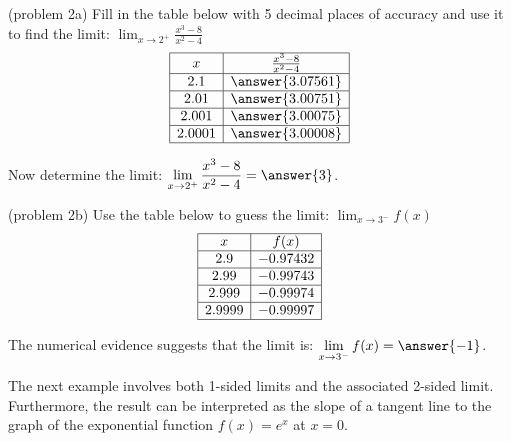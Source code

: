 \documentclass[handout]{ximera}
\begin{document}
\begin{problem}(problem 2a)
Fill in the table below with 5 decimal places of accuracy and use it to find the limit: $\displaystyle \lim_{x \to 2^+} \frac{x^3 - 8}{x^2 - 4}$\\

\[
\begin{array}{| c | c|}
	\hline
  x & \frac{x^3 - 8}{x^2 - 4}  \\ 
	\hline 
	2.1 &  \answer{3.07561}\\
	\hline
	2.01 &  \answer{3.00751}\\
	\hline
	2.001 &  \answer{3.00075}\\
	\hline
	2.0001 &  \answer{3.00008}\\
	\hline
\end{array}
\]


Now determine the limit: $\displaystyle \lim_{x \to 2^+} \frac{x^3 - 8}{x^2 - 4} = \answer{3}$.
\end{problem}


\begin{problem}(problem 2b)
Use the table below to guess the limit: $\displaystyle \lim_{x \to 3^-} f(x)$\\

\[
\begin{array}{ |c | c|}
	\hline
  x & f(x)  \\ 
	\hline 
	2.9 &  -0.97432\\
	\hline
	2.99 &  -0.99743\\
	\hline
	2.999 &  -0.99974\\
	\hline
	2.9999 &  -0.99997\\
	\hline
\end{array}
\]

The numerical evidence suggests that the limit is: $\displaystyle \lim_{x \to 3^-} f(x) = \answer{-1}$.
\end{problem}



The next example involves both 1-sided limits and the associated 2-sided limit. 
Furthermore, the result can be interpreted as the slope of a tangent line to the graph of the exponential function $f(x) = e^x$ at $x=0$.
\end{document}

